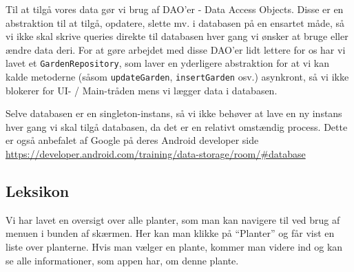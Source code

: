 Til at tilgå vores data gør vi brug af DAO'er - Data Access Objects. Disse er en abstraktion til at tilgå, opdatere, slette mv. i databasen på en ensartet måde, så vi ikke skal skrive queries direkte til databasen hver gang vi ønsker at bruge eller ændre data deri.
For at gøre arbejdet med disse DAO'er lidt lettere for os har vi lavet et \texttt{GardenRepository}, som laver en yderligere abstraktion for at vi kan kalde metoderne (såsom \texttt{updateGarden}, \texttt{insertGarden} osv.) asynkront, så vi ikke blokerer for UI- / Main-tråden mens vi lægger data i databasen.

Selve databasen er en singleton-instans, så vi ikke behøver at lave en ny instans hver gang vi skal tilgå databasen, da det er en relativt omstændig process. Dette er også anbefalet af Google på deres Android developer side \hyperlink{https://developer.android.com/training/data-storage/room/#database}{https://developer.android.com/training/data-storage/room/#database}

\subsection{Leksikon}

Vi har lavet en oversigt over alle planter, som man kan navigere til ved brug af menuen i bunden af skærmen. Her kan man klikke på ``Planter'' og får vist en liste over planterne. Hvis man vælger en plante, kommer man videre ind og kan se alle informationer, som appen har, om denne plante.
